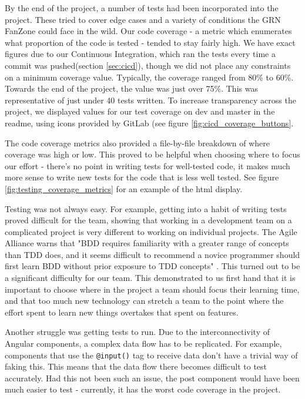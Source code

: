 \documentclass{l3proj}
\begin{document}
By the end of the project, a number of tests had been incorporated into the 
 project. These tried to cover edge cases and a variety of conditions the GRN FanZone 
 could face in the wild. Our code coverage - a metric which enumerates what 
 proportion of the code is tested - tended to stay fairly high. We have exact 
 figures due to our Continuous Integration, which ran the tests every time a 
 commit was pushed(section \ref{sec:cicd}), though we did not place any constraints 
 on a minimum coverage value. Typically, the coverage ranged from 80\% to 60\%. 
 Towards the end of the project, the value was just over 75\%. This was 
 representative of just under 40 tests written. To increase transparency 
 across the project, we displayed values for our test coverage on dev and 
 master in the readme, using icons provided by GitLab (see figure 
 \ref{fig:cicd_coverage_buttons}.

 The code coverage metrics also provided a file-by-file breakdown of where
 coverage was high or low. This proved to be helpful when choosing
 where to focus our effort - there's no point in writing tests for
 well-tested code, it makes much more sense to write new tests for the
 code that is less well tested. See figure \ref{fig:testing_coverage_metrics}
 for an example of the html display.

Testing was not always easy. For example, getting into a habit of writing tests
 proved difficult for the team, showing that working in a development team on a
 complicated project is very different to working on individual projects. The
 Agile Alliance warns that "BDD requires familiarity with a greater range of
 concepts than TDD does, and it seems difficult to recommend a novice programmer
 should first learn BDD without prior exposure to TDD concepts"
 \cite{agilealliance_bdd}. This turned out to be a significant difficulty for
 our team. This demonstrated to us first hand that it is important to choose where
 in the project a team should focus their learning time, and that too much new technology
 can stretch a team to the point where the effort spent to learn new things 
 overtakes that spent on features.

Another struggle was getting tests to run. Due to the interconnectivity of
 Angular components, a complex data flow has to be replicated. For example,
 components that use the \texttt{@input()} tag to receive data don't have a
 trivial way of faking this. This means that the data flow there becomes
 difficult to test accurately. Had this not been such an issue, the post
 component would have been much easier to test - currently, it has the worst
 code coverage in the project.
\end{document}
